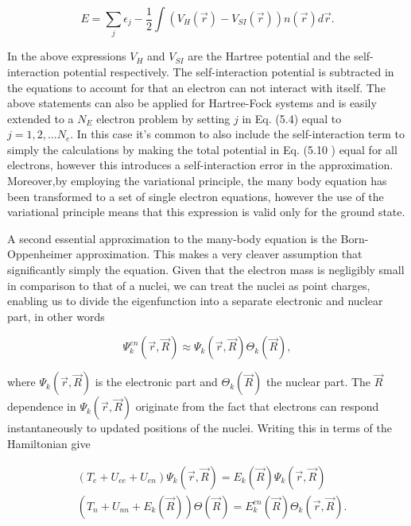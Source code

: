 \begin{equation}
E = \sum_j \epsilon_j - \frac{1}{2} \int \left( V_H(\vec{r}) - V_{SI}(\vec{r}) \right) n(\vec{r})d\vec{r}.
\end{equation} 
 
In the above expressions $V_H$ and $V_{SI}$ are the Hartree potential and the self-interaction potential respectively. The self-interaction potential is subtracted in the equations to account for that an electron can not interact with itself. The above statements can also be applied for Hartree-Fock systems and is easily extended to a $N_E$ electron problem by setting $j$ in Eq. (5.4) equal to $j = 1, 2, \dots N_e$. In this case it's common to also include the self-interaction term to simply the calculations by making the total potential in Eq. (5.10 ) equal for all electrons, however this introduces a self-interaction error in the approximation. Moreover,by employing the variational principle, the many body equation has been transformed to a set of single electron equations, however the use of the variational principle means that this expression is valid only for the ground state. 

A second essential approximation to the many-body equation is the Born-Oppenheimer approximation. This makes a very cleaver assumption that significantly simply the equation. Given that the electron mass is negligibly small in comparison to that of a nuclei, we can treat the nuclei as point charges, enabling us to divide the eigenfunction into a separate electronic and nuclear part, in other words

\begin{equation}
    \Psi_{k}^{en}(\vec{r}, \vec{R}) \approx \Psi_k(\vec{r}, \vec{R}) \Theta_k(\vec{R}),
\end{equation}

where $\Psi_k(\vec{r}, \vec{R})$ is the electronic part and $\Theta_k(\vec{R})$ the nuclear part. The $\vec{R}$ dependence in $\Psi_k(\vec{r}, \vec{R})$ originate from the fact that electrons can respond instantaneously to updated positions of the nuclei. Writing this in terms of the Hamiltonian give

\begin{align}
    &\left( T_{e} + U_{ee} + U_{en} \right) \Psi_k(\vec{r}, \vec{R}) = E_k(\vec{R})\Psi_k(\vec{r}, \vec{R}) \\
    &\left( T_{n} + U_{nn} + E_k(\vec{R}) \right) \Theta(\vec{R}) = E_{k}^{en}(\vec{R})\Theta_k(\vec{r}, \vec{R}).
\end{align}

